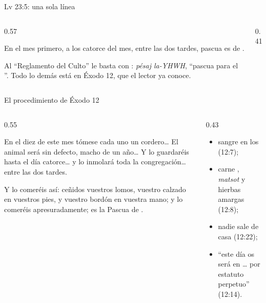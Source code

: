\begin{frame}{Lv 23:5: una sola línea}
\begin{columns}[c,onlytextwidth]
\begin{column}{0.57\textwidth}
\centering{}
\begin{cita}En el mes primero, a los catorce del mes, entre las dos tardes, pascua es de \SENOR.\end{cita}
\small\RaggedRight Al ``Reglamento del Culto'' le basta con : \emph{pésaj la-YHWH}, ``pascua para el \SENOR''. Todo lo demás está en Éxodo 12, que el lector ya conoce.
\end{column}
\begin{column}{0.41\textwidth}\end{column}
\end{columns}
\end{frame}

\begin{frame}{El procedimiento de Éxodo 12}
\begin{columns}[t,onlytextwidth]
\begin{column}{0.55\textwidth}
\begin{cita}En el diez de este mes tómese cada uno un cordero\ldots{} El animal será sin defecto, macho de un año\ldots{} Y lo guardaréis hasta el día catorce\ldots{} y lo inmolará toda la congregación\ldots{} entre las dos tardes.\end{cita}
\begin{cita}Y lo comeréis así: ceñidos vuestros lomos, vuestro calzado en vuestros pies, y vuestro bordón en vuestra mano; y lo comeréis apresuradamente; es la Pascua de \SENOR.\end{cita}
\end{column}
\begin{column}{0.43\textwidth}\small
\begin{itemize}
\item sangre en los  (12:7);
\item carne , \emph{matsot} y hierbas amargas (12:8);
\item nadie sale de casa  (12:22);
\item ``este día os será en \ldots{} por estatuto perpetuo'' (12:14).
\end{itemize}
\end{column}
\end{columns}
\end{frame}

